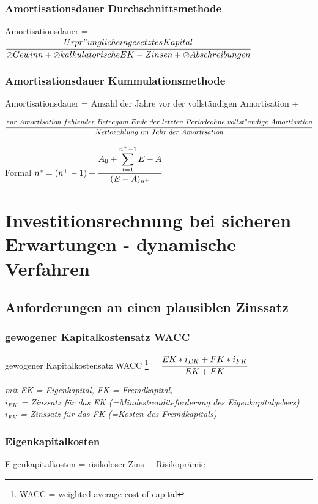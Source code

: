 \documentclass[a4paper,12pt]{scrartcl}
\begin{document}
\subsubsection{Amortisationsdauer Durchschnittsmethode}
Amortisationsdauer = $\cfrac{Urpr"unglich eingesetztes Kapital}{\oslash Gewinn + \oslash kalkulatorische EK-Zinsen + \oslash Abschreibungen}$
\subsubsection{Amortisationsdauer Kummulationsmethode}
Amortisationsdauer = Anzahl der Jahre vor der vollständigen Amortisation + \\ 
\begin{small}
$\cfrac{zur~Amortisation~fehlender~Betrag \\ am~Ende~der~letzten~Periode ohne~vollst"andige~Amortisation}{Nettozahlung~im~Jahr~der~Amortisation}$
\end{small}



Formal $n^* = (n^+ - 1) + \cfrac{A_0 + \displaystyle\sum_{t=1}^{n^+-1} E-A}{(E - A)_{n^+}}$

\section{Investitionsrechnung bei sicheren Erwartungen - dynamische Verfahren}
\subsection{Anforderungen an einen plausiblen Zinssatz}
\subsubsection{gewogener Kapitalkostensatz WACC}
gewogener Kapitalkostensatz WACC \footnote{WACC = weighted average cost of capital} = $\cfrac{EK * i_{EK} + FK * i_{FK}}{EK + FK}$ \\
\vspace*{5mm}

\begin{small}
\textit{mit EK = Eigenkapital, FK = Fremdkapital, \\ $i_{EK}$ = Zinssatz für das EK (=Mindestrenditeforderung des Eigenkapitalgebers) \\ $i_{FK}$ = Zinssatz für das FK (=Kosten des Fremdkapitals)
}
\end{small}
\subsubsection{Eigenkapitalkosten}
Eigenkapitalkosten = risikoloser Zins + Risikoprämie
\end{document}
